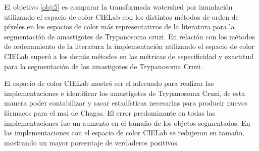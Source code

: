 El objetivo \ref{obj:5} es comparar la transformada watershed por inundación utilizando el espacio de color CIELab con los distintos métodos de orden de píxeles en los espacios de color más representativos de la literatura para la segmentación de amastigotes de Trypanosoma cruzi. En relación con los métodos de ordenamiento de la literatura la implementación utilizando el espacio de color CIELab superó a los demás métodos en las métricas de especificidad y exactitud para la segmentación de los amastigotes de Trypanosoma Cruzi.

El espacio de color CIELab mostró ser el adecuado para realizar las implementaciones e identificar los amastigotes de Trypanosoma Cruzi, de esta manera poder contabilizar y sacar estadísticas necesarias para producir nuevos fármacos para el mal de Chagas.
El error predominante en todas las implementaciones fue un aumento en el tamaño de los objetos segmentados. En las implementaciones con el espacio de color CIELab se redujeron en tamaño, mostrando un mayor porcentaje de verdaderos positivos.